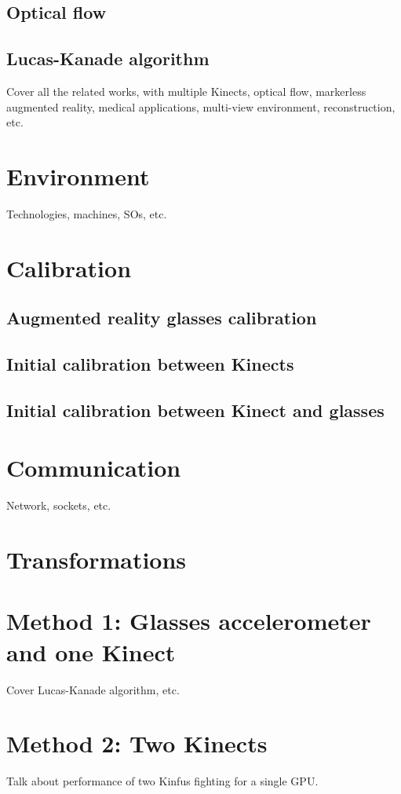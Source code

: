\documentclass[msc, a4paper, classic, pt]{ufbathesis}
\begin{document}
\subsection{Optical flow}
\subsection{Lucas-Kanade algorithm}

Cover all the related works, with multiple Kinects, optical flow, markerless augmented reality, medical applications, multi-view environment, reconstruction, etc.

\section{Environment}
Technologies, machines, SOs, etc.
\section{Calibration}
\subsection{Augmented reality glasses calibration}
\subsection{Initial calibration between Kinects}
\subsection{Initial calibration between Kinect and glasses}
\section{Communication}
Network, sockets, etc.
\section{Transformations}
\section{Method 1: Glasses accelerometer and one Kinect}
Cover Lucas-Kanade algorithm, etc.
\section{Method 2: Two Kinects}
Talk about performance of two Kinfus fighting for a single GPU.
\end{document}
